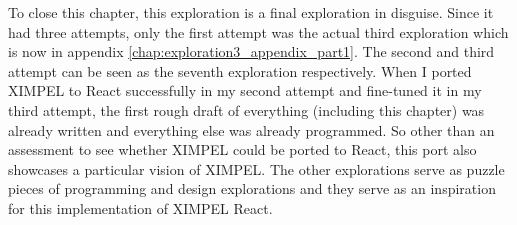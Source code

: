 To close this chapter, this exploration is a final exploration in disguise. Since it had three attempts, only the first attempt was the actual third exploration which is now in appendix \ref{chap:exploration3_appendix_part1}. The second and third attempt can be seen as the seventh exploration respectively. When I ported XIMPEL to React successfully in my second attempt and fine-tuned it in my third attempt, the first rough draft of everything (including this chapter) was already written and everything else was already programmed. So other than an assessment to see whether XIMPEL could be ported to React, this port also showcases a particular vision of XIMPEL. The other explorations serve as puzzle pieces of programming and design explorations and they serve as an inspiration for this implementation of XIMPEL React.